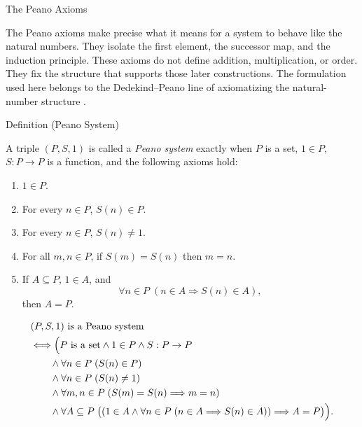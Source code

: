 \begin{topicbox}{The Peano Axioms}
\begin{exposition}
The Peano axioms make precise what it means for a system to behave like
the natural numbers. They isolate the first element, the successor map,
and the induction principle. These axioms do not define addition,
multiplication, or order. They fix the structure that supports those
later constructions. The formulation used here belongs to the
Dedekind--Peano line of axiomatizing the natural-number structure
\citep{dedekind1901essays,PeanoArithmeticesPrincipia1889}.
\end{exposition}

\begin{definitionbox}{Definition (Peano System)}
\begin{definition}
\label{def:peano-system}
A triple $(P,S,1)$ is called a \emph{Peano system} exactly when $P$ is a set,
$1 \in P$, $S : P \to P$ is a function, and the following axioms hold:
\begin{enumerate}
  \item[\textbf{P1.}] $1 \in P$.
  \item[\textbf{P2.}] For every $n \in P$, $S(n) \in P$.
  \item[\textbf{P3.}] For every $n \in P$, $S(n) \neq 1$.
  \item[\textbf{P4.}] For all $m,n \in P$, if $S(m)=S(n)$ then $m=n$.
  \item[\textbf{P5.}] If $A \subseteq P$, $1 \in A$, and
  \[
    \forall n \in P\;(n \in A \Longrightarrow S(n) \in A),
  \]
  then $A=P$.
\end{enumerate}
\end{definition}
\end{definitionbox}

\begin{remark*}
\[
\begin{aligned}
&(P,S,1) \text{ is a Peano system}\\
&\Longleftrightarrow
\Bigl(P \text{ is a set} \land 1 \in P \land S : P \to P \\
&\qquad \land \forall n \in P\;(S(n) \in P) \\
&\qquad \land \forall n \in P\;(S(n) \neq 1) \\
&\qquad \land \forall m,n \in P\;(S(m)=S(n) \Longrightarrow m=n) \\
&\qquad \land \forall A \subseteq P\;
\bigl((1 \in A \land
\forall n \in P\;(n \in A \Longrightarrow S(n) \in A))
\Longrightarrow A=P\bigr)\Bigr).
\end{aligned}
\]
\end{remark*}


\end{topicbox}
